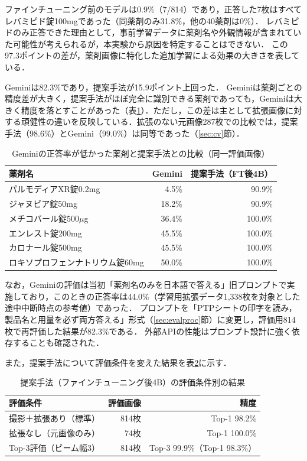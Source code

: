 \documentclass[dvipdfmx]{jsarticle}
\begin{document}
ファインチューニング前のモデルは0.9\%（7/814）であり，正答した7枚はすべてレバミピド錠100mgであった（同薬剤のみ31.8\%，他の40薬剤は0\%）．
レバミピドのみ正答できた理由として，事前学習データに薬剤名や外観情報が含まれていた可能性が考えられるが，本実験から原因を特定することはできない．
この97.3ポイントの差が，薬剤画像に特化した追加学習による効果の大きさを表している．

Geminiは82.3\%であり，提案手法が15.9ポイント上回った．
Geminiは薬剤ごとの精度差が大きく，提案手法がほぼ完全に識別できる薬剤であっても，Geminiは大きく精度を落とすことがあった（表\ref{tab:gemini_weak}）．ただし，この差は主として拡張画像に対する頑健性の違いを反映している．拡張のない元画像287枚での比較では，提案手法（98.6\%）とGemini（99.0\%）は同等であった（\ref{sec:cv}節）．

\begin{table}[htbp]
\centering
\caption{Geminiの正答率が低かった薬剤と提案手法との比較（同一評価画像）}
\label{tab:gemini_weak}
\small
\begin{tabular}{lrr}
\hline
薬剤名 & Gemini & 提案手法（FT後4B） \\
\hline
パルモディアXR錠0.2mg & 4.5\% & 90.9\% \\
ジャヌビア錠50mg & 18.2\% & 90.9\% \\
メチコバール錠500$\mu$g & 36.4\% & 100.0\% \\
エンレスト錠200mg & 45.5\% & 100.0\% \\
カロナール錠500mg & 45.5\% & 100.0\% \\
ロキソプロフェンナトリウム錠60mg & 50.0\% & 100.0\% \\
\hline
\end{tabular}
\end{table}

なお，Geminiの評価は当初「薬剤名のみを日本語で答える」旧プロンプトで実施しており，このときの正答率は44.0\%（学習用拡張データ1,338枚を対象とした途中中断時点の参考値）であった．
プロンプトを「PTPシートの印字を読み，製品名と用量を必ず両方答える」形式（\ref{sec:evalproc}節）に変更し，評価用814枚で再評価した結果が82.3\%である．
外部APIの性能はプロンプト設計に強く依存することも確認された．

また，提案手法について評価条件を変えた結果を表\ref{tab:single_extra}に示す．

\begin{table}[htbp]
\centering
\caption{提案手法（ファインチューニング後4B）の評価条件別の結果}
\label{tab:single_extra}
\begin{tabular}{lrr}
\hline
評価条件 & 評価画像 & 精度 \\
\hline
撮影＋拡張あり（標準） & 814枚 & Top-1 98.2\% \\
拡張なし（元画像のみ） & 74枚 & Top-1 100.0\% \\
Top-3評価（ビーム幅3） & 814枚 & Top-3 99.9\%（Top-1 98.3\%） \\
\hline
\end{tabular}
\end{table}
\end{document}
